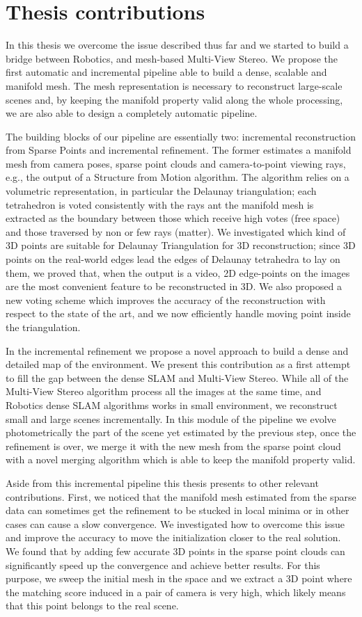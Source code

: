\section{Thesis contributions}
In this thesis we overcome the issue described thus far and we started to build a bridge between Robotics, and mesh-based Multi-View Stereo.
We propose the first automatic and incremental pipeline able to build a dense, scalable and manifold mesh.
The mesh representation is necessary to reconstruct  large-scale scenes and, by keeping the manifold property valid along the whole processing, we are also able to design a completely automatic pipeline.

The building blocks of our pipeline are essentially two: incremental reconstruction from Sparse Points and incremental refinement.
The former estimates a  manifold mesh from camera poses, sparse point clouds and camera-to-point viewing rays, e.g., the output of a Structure from Motion algorithm.
The algorithm relies on a volumetric representation, in particular the Delaunay triangulation; each tetrahedron is voted consistently with the rays ant the manifold mesh is extracted as the boundary between those which receive high votes (free space) and those traversed by non or few rays (matter).
We investigated which kind of 3D points are suitable for Delaunay Triangulation for 3D reconstruction; since 3D points on the real-world edges lead the edges of Delaunay tetrahedra to lay on them, we proved that, when the output is a video, 2D edge-points on the images are the most convenient feature to be reconstructed in 3D.
We also proposed a new voting scheme which improves the accuracy of the reconstruction with respect to the state of the art, and we now efficiently handle moving point inside the triangulation.

In the incremental refinement we propose a novel approach to build a dense and detailed map of the environment. 
We present this contribution as a first attempt to fill the gap between the dense SLAM and Multi-View Stereo.
While all of the Multi-View Stereo algorithm process all the images  at the same time, and Robotics dense SLAM algorithms works in small environment, we reconstruct small and large scenes incrementally. 
In this module of the pipeline we evolve photometrically the part of the scene yet estimated by the previous step, once the refinement is over, we merge it with the new mesh from the sparse point cloud with a novel merging algorithm which is able to keep the manifold property valid.

Aside from this incremental pipeline this thesis presents to other relevant contributions.
First, we noticed that the manifold mesh estimated from the sparse data can sometimes get the refinement to be stucked  in local minima or in other cases can cause a slow convergence. 
We investigated how to overcome this issue and improve the accuracy to move the initialization closer to the real solution.
We found that by adding few accurate 3D points in the sparse point clouds can significantly speed up the convergence and achieve better results.
For this purpose, we sweep the initial mesh in the space and we extract a 3D point where the matching score induced in a pair of camera is very high, which likely means that this point belongs to the real scene.

